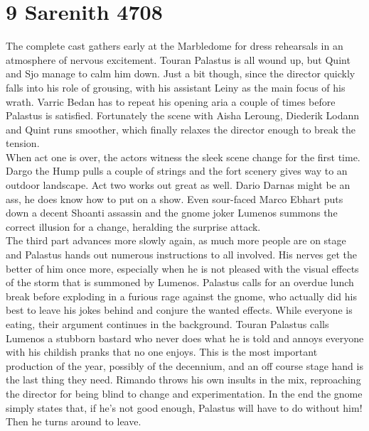 \section{9 Sarenith 4708}

The complete cast gathers early at the Marbledome for dress rehearsals in an atmosphere of nervous excitement. Touran Palastus is all wound up, but Quint and Sjo manage to calm him down. Just a bit though, since the director quickly falls into his role of grousing, with his assistant Leiny as the main focus of his wrath. Varric Bedan has to repeat his opening aria a couple of times before Palastus is satisfied. Fortunately the scene with Aisha Leroung, Diederik Lodann and Quint runs smoother, which finally relaxes the director enough to break the tension.\\

When act one is over, the actors witness the sleek scene change for the first time. Dargo the Hump pulls a couple of strings and the fort scenery gives way to an outdoor landscape. Act two works out great as well. Dario Darnas might be an ass, he does know how to put on a show. Even sour-faced Marco Ebhart puts down a decent Shoanti assassin and the gnome joker Lumenos summons the correct illusion for a change, heralding the surprise attack.\\

The third part advances more slowly again, as much more people are on stage and Palastus hands out numerous instructions to all involved. His nerves get the better of him once more, especially when he is not pleased with the visual effects of the storm that is summoned by Lumenos. Palastus calls for an overdue lunch break before exploding in a furious rage against the gnome, who actually did his best to leave his jokes behind and conjure the wanted effects. While everyone is eating, their argument continues in the background. Touran Palastus calls Lumenos a stubborn bastard who never does what he is told and annoys everyone with his childish pranks that no one enjoys. This is the most important production of the year, possibly of the decennium, and an off course stage hand is the last thing they need. Rimando throws his own insults in the mix, reproaching the director for being blind to change and experimentation. In the end the gnome simply states that, if he's not good enough, Palastus will have to do without him! Then he turns around to leave.\\

